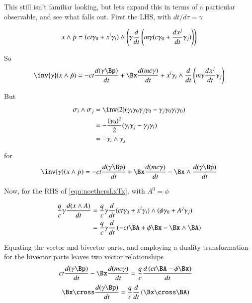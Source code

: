 \documentclass{article}      %
\begin{document}
This still isn't familiar looking, but lets expand this in terms of a particular observable, and see what falls out.  First the LHS, with $dt/d\tau = \gamma$

\begin{align*}
x \wedge \dot{p} &= (ct \gamma_0 + x^i \gamma_i) \wedge 
\left( \gamma \frac{d}{dt}\left( m \gamma (c \gamma_0 + \frac{dx^j}{dt} \gamma_j ) \right) \right) \\
\end{align*}

So
\begin{align*}
\inv{\gamma} (x \wedge \pdot)
&= 
- ct \frac{d (\gamma \Bp)}{dt}
+ \Bx \frac{d (m c \gamma)}{dt} 
+ x^i \gamma_i \wedge 
\frac{d}{dt}\left( m \gamma \frac{dx^j}{dt} \gamma_j \right) \\
\end{align*}

But
\begin{align*}
\sigma_i \wedge \sigma_j
&= \inv{2}( \gamma_i \gamma_0 \gamma_j \gamma_0 - \gamma_j \gamma_0 \gamma_i \gamma_0) \\
&= -\frac{(\gamma_0)^2}{2}( \gamma_i \gamma_j - \gamma_j \gamma_i ) \\
&= -\gamma_i \wedge \gamma_j \\
\end{align*}

for
\begin{align*}
\inv{\gamma} (x \wedge \pdot)
&= 
- ct \frac{d (\gamma \Bp)}{dt}
+ \Bx \frac{d (m c \gamma)}{dt} 
- \Bx \wedge \frac{d( \gamma \Bp )}{dt} \\
\end{align*}

Now, for the RHS of \ref{eqn:noethersLxTx}, with $A^0 = \phi$

\begin{align*}
\frac{q}{c} \gamma \frac{d(x \wedge A)}{dt}
&= \frac{q}{c} \gamma \frac{d}{dt} (ct \gamma_0 + x^i \gamma_i) \wedge (\phi \gamma_0 + A^j \gamma_j) \\
&= \frac{q}{c} \gamma \frac{d}{dt} \left( -ct \BA + \phi \Bx - \Bx \wedge \BA \right)
\end{align*}

Equating the vector and bivector parts, and employing a duality transformation for the bivector parts leaves two vector relationships
\begin{align}\label{eqn:boostresultspacetime}
ct \frac{d (\gamma \Bp)}{dt} - \Bx \frac{d (m c \gamma)}{dt} &= \frac{q}{c} \frac{d \left( ct \BA - \phi \Bx \right) }{dt}
\end{align}
\begin{align}\label{eqn:rotation}
\Bx \cross \frac{d( \gamma \Bp )}{dt} &= \frac{q}{c} \frac{d}{dt} \left( \Bx \cross \BA \right)
\end{align}
\end{document}
